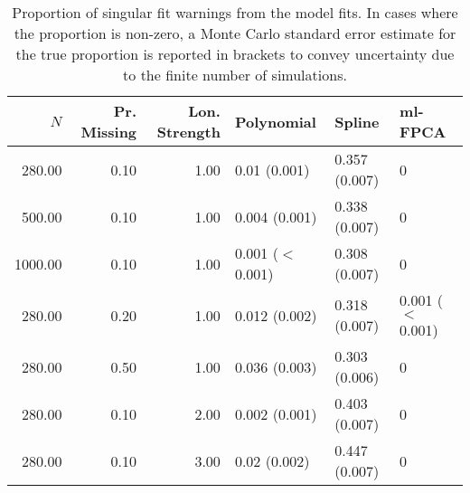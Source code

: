 \begin{table}[ht]
\centering
\begin{tabular}{rrrlll}
  \toprule
{\bfseries \small $N$} & {\bfseries \small Pr. Missing} & {\bfseries \small Lon. Strength} & {\bfseries \small Polynomial} & {\bfseries \small Spline} & {\bfseries \small ml-FPCA} \\ 
  \midrule
280.00 & 0.10 & 1.00 & 0.01 (0.001) & 0.357 (0.007) & 0 \\ 
  500.00 & 0.10 & 1.00 & 0.004 (0.001) & 0.338 (0.007) & 0 \\ 
  1000.00 & 0.10 & 1.00 & 0.001 ($<$ 0.001) & 0.308 (0.007) & 0 \\ 
  280.00 & 0.20 & 1.00 & 0.012 (0.002) & 0.318 (0.007) & 0.001 ($<$ 0.001) \\ 
  280.00 & 0.50 & 1.00 & 0.036 (0.003) & 0.303 (0.006) & 0 \\ 
  280.00 & 0.10 & 2.00 & 0.002 (0.001) & 0.403 (0.007) & 0 \\ 
  280.00 & 0.10 & 3.00 & 0.02 (0.002) & 0.447 (0.007) & 0 \\ 
   \bottomrule
\end{tabular}
\caption{Proportion of singular fit warnings from the model fits. In cases where the proportion is non-zero, a Monte Carlo standard error estimate for the true proportion is reported in brackets to convey uncertainty due to the finite number of simulations.} 
\label{tab:singularity-table}
\end{table}
